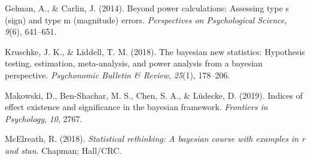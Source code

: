 \documentclass[
  english,
  man,floatsintext]{apa6}
\newlength{\cslhangindent}
\newenvironment{CSLReferences}[2] %
 {\begin{list}{}{%
  \setlength{\itemindent}{0pt}
  \setlength{\leftmargin}{0pt}
  \setlength{\parsep}{0pt}
  \ifodd #1
   \setlength{\leftmargin}{\cslhangindent}
   \setlength{\itemindent}{-1\cslhangindent}
  \fi
  \setlength{\itemsep}{#2\baselineskip}}}
 {\end{list}}
\begin{document}
\protect{}\label{refs}
\begin{CSLReferences}{1}{0}
Gelman, A., \& Carlin, J. (2014). Beyond power calculations: Assessing type s (sign) and type m (magnitude) errors. \emph{Perspectives on Psychological Science}, \emph{9}(6), 641--651.

Kruschke, J. K., \& Liddell, T. M. (2018). The bayesian new statistics: Hypothesis testing, estimation, meta-analysis, and power analysis from a bayesian perspective. \emph{Psychonomic Bulletin \& Review}, \emph{25}(1), 178--206.

Makowski, D., Ben-Shachar, M. S., Chen, S. A., \& Lüdecke, D. (2019). Indices of effect existence and significance in the bayesian framework. \emph{Frontiers in Psychology}, \emph{10}, 2767.

McElreath, R. (2018). \emph{Statistical rethinking: A bayesian course with examples in r and stan}. Chapman; Hall/CRC.

\end{CSLReferences}
\end{document}

